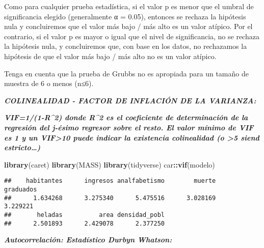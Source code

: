 \documentclass[]{article}
\newenvironment{Shaded}{\begin{snugshade}}{\end{snugshade}}
\newcommand{\KeywordTok}[1]{\textcolor[rgb]{0.13,0.29,0.53}{\textbf{#1}}}
\newcommand{\DataTypeTok}[1]{\textcolor[rgb]{0.13,0.29,0.53}{#1}}
\newcommand{\DecValTok}[1]{\textcolor[rgb]{0.00,0.00,0.81}{#1}}
\newcommand{\StringTok}[1]{\textcolor[rgb]{0.31,0.60,0.02}{#1}}
\newcommand{\CommentTok}[1]{\textcolor[rgb]{0.56,0.35,0.01}{\textit{#1}}}
\newcommand{\OperatorTok}[1]{\textcolor[rgb]{0.81,0.36,0.00}{\textbf{#1}}}
\newcommand{\NormalTok}[1]{#1}
\begin{document}
Como para cualquier prueba estadística, si el valor p es menor que el
umbral de significancia elegido (generalmente α = 0.05), entonces se
rechaza la hipótesis nula y concluiremos que el valor más bajo / más
alto es un valor atípico. Por el contrario, si el valor p es mayor o
igual que el nivel de significancia, no se rechaza la hipótesis nula, y
concluiremos que, con base en los datos, no rechazamos la hipótesis de
que el valor más bajo / más alto no es un valor atípico.

Tenga en cuenta que la prueba de Grubbs no es apropiada para un tamaño
de muestra de 6 o menos (n≤6).

\emph{\textbf{COLINEALIDAD - FACTOR DE INFLACIÓN DE LA VARIANZA:}}

\emph{\textbf{VIF=1/(1-R\^{}2) donde R\^{}2 es el coeficiente de
determinación de la regresión del j-ésimo regresor sobre el resto. El
valor mínimo de VIF es 1 y un VIF\textgreater{}10 puede indicar la
existencia colinealidad (o \textgreater{}5 siend estricto\ldots{}) }}

\begin{Shaded}
\begin{Highlighting}[]
\KeywordTok{library}\NormalTok{(caret)}
\KeywordTok{library}\NormalTok{(MASS)}
\KeywordTok{library}\NormalTok{(tidyverse)}
\NormalTok{car}\OperatorTok{::}\KeywordTok{vif}\NormalTok{(modelo)}
\end{Highlighting}
\end{Shaded}

\begin{verbatim}
##    habitantes      ingresos analfabetismo        muerte     graduados 
##      1.634268      3.275340      5.475516      3.028169      3.229221 
##       heladas          area densidad_pobl 
##      2.501893      2.429078      2.377250
\end{verbatim}

\emph{\textbf{Autocorrelación: Estadístico Durbyn Whatson:}}

\begin{Shaded}
\end{Shaded}
\end{document}
